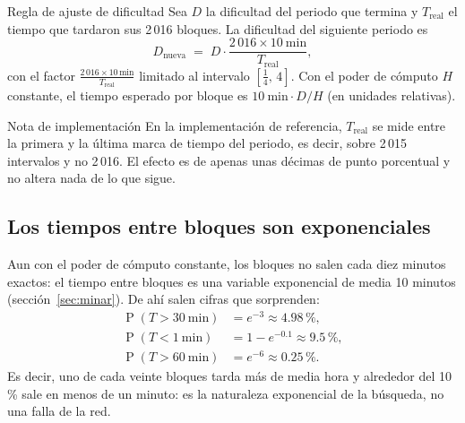 \documentclass[11pt,a4paper]{article}
\newcommand{\Prob}[1]{\operatorname{P}\!\left(#1\right)}
\begin{document}
\begin{resultado}{Regla de ajuste de dificultad}\label{res:ajuste}
Sea $D$ la dificultad del periodo que termina y $T_{\text{real}}$ el tiempo que tardaron sus 2\,016 bloques. La dificultad del siguiente periodo es
\[
  D_{\text{nueva}}\;=\;D\cdot\frac{2\,016\times 10\ \text{min}}{T_{\text{real}}},
\]
con el factor $\frac{2\,016\times10\,\text{min}}{T_{\text{real}}}$ limitado al intervalo $\left[\tfrac14,\,4\right]$. Con el poder de cómputo $H$ constante, el tiempo esperado por bloque es $10\ \text{min}\cdot D/H$ (en unidades relativas).
\end{resultado}

\begin{nota}{Nota de implementación}
En la implementación de referencia, $T_{\text{real}}$ se mide entre la primera y la última marca de tiempo del periodo, es decir, sobre 2\,015 intervalos y no 2\,016. El efecto es de apenas unas décimas de punto porcentual y no altera nada de lo que sigue.
\end{nota}

\subsection{Los tiempos entre bloques son exponenciales}

Aun con el poder de cómputo constante, los bloques no salen cada diez minutos exactos: el tiempo entre bloques es una variable exponencial de media 10 minutos (sección~\ref{sec:minar}). De ahí salen cifras que sorprenden:
\begin{align*}
  \Prob{T>30\ \text{min}}&=e^{-3}\approx 4.98\,\%,\\
  \Prob{T<1\ \text{min}}&=1-e^{-0.1}\approx 9.5\,\%,\\
  \Prob{T>60\ \text{min}}&=e^{-6}\approx 0.25\,\%.
\end{align*}
Es decir, uno de cada veinte bloques tarda más de media hora y alrededor del 10\,\% sale en menos de un minuto: es la naturaleza exponencial de la búsqueda, no una falla de la red.
\end{document}
